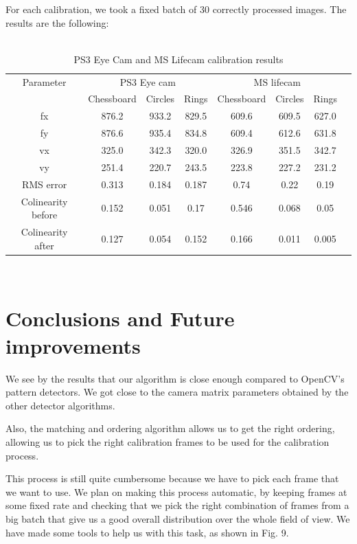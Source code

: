 \documentclass[journal]{IEEEtran}
\begin{document}
For each calibration, we took a fixed batch of 30 correctly processed images. The results are the following:
\\
\\
\begin{table}[h]
\centering
\begin{tabular}{ |c||c|c|c|c|c|c|c|  }
 \hline
 Parameter & \multicolumn{3}{c|}{PS3 Eye cam} & \multicolumn{3}{c|}{MS lifecam}\\
 \cline{2-7}
 & Chessboard & Circles & Rings & Chessboard & Circles & Rings \\
 \hline
 fx        & 876.2 & 933.2 & 829.5 & 609.6 & 609.5 & 627.0\\
 fy        & 876.6 & 935.4 & 834.8 & 609.4 & 612.6 & 631.8\\
 vx        & 325.0 & 342.3 & 320.0 & 326.9 & 351.5 & 342.7\\
 vy 	       & 251.4 & 220.7 & 243.5 & 223.8 & 227.2 & 231.2\\
 RMS error & 0.313 & 0.184 & 0.187 & 0.74 & 0.22 & 0.19\\
 Colinearity before & 0.152 & 0.051 & 0.17 & 0.546 & 0.068 & 0.05\\
 Colinearity after & 0.127 & 0.054 & 0.152 & 0.166 & 0.011 & 0.005\\
 \hline
\end{tabular}
\\
\caption{PS3 Eye Cam and MS Lifecam calibration results}
\end{table}

\section{Conclusions and Future improvements}
We see by the results that our algorithm is close enough compared to OpenCV's pattern detectors. We got close to the camera matrix parameters obtained by the other detector algorithms.

Also, the matching and ordering algorithm allows us to get the right ordering, allowing us to pick the right calibration frames to be used for the calibration process.

This process is still quite cumbersome because we have to pick each frame that we want to use. We plan on making this process automatic, by keeping frames at some fixed rate and checking that we pick the right combination of frames from a big batch that give us a good overall distribution over the whole field of view. We have made some tools to help us with this task, as shown in Fig. 9.
\end{document}
